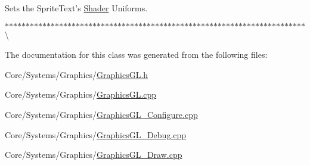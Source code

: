 Sets the Sprite\-Text's \hyperlink{classDCEngine_1_1Shader}{Shader} Uniforms.  

$\ast$$\ast$$\ast$$\ast$$\ast$$\ast$$\ast$$\ast$$\ast$$\ast$$\ast$$\ast$$\ast$$\ast$$\ast$$\ast$$\ast$$\ast$$\ast$$\ast$$\ast$$\ast$$\ast$$\ast$$\ast$$\ast$$\ast$$\ast$$\ast$$\ast$$\ast$$\ast$$\ast$$\ast$$\ast$$\ast$$\ast$$\ast$$\ast$$\ast$$\ast$$\ast$$\ast$$\ast$$\ast$$\ast$$\ast$$\ast$$\ast$$\ast$$\ast$$\ast$$\ast$$\ast$$\ast$$\ast$$\ast$$\ast$$\ast$$\ast$$\ast$$\ast$$\ast$$\ast$$\ast$$\ast$$\ast$$\ast$$\ast$$\ast$$\ast$$\ast$\textbackslash{} 

The documentation for this class was generated from the following files\-:\begin{DoxyCompactItemize}
\item 
Core/\-Systems/\-Graphics/\hyperlink{GraphicsGL_8h}{Graphics\-G\-L.\-h}\item 
Core/\-Systems/\-Graphics/\hyperlink{GraphicsGL_8cpp}{Graphics\-G\-L.\-cpp}\item 
Core/\-Systems/\-Graphics/\hyperlink{GraphicsGL__Configure_8cpp}{Graphics\-G\-L\-\_\-\-Configure.\-cpp}\item 
Core/\-Systems/\-Graphics/\hyperlink{GraphicsGL__Debug_8cpp}{Graphics\-G\-L\-\_\-\-Debug.\-cpp}\item 
Core/\-Systems/\-Graphics/\hyperlink{GraphicsGL__Draw_8cpp}{Graphics\-G\-L\-\_\-\-Draw.\-cpp}\end{DoxyCompactItemize}
